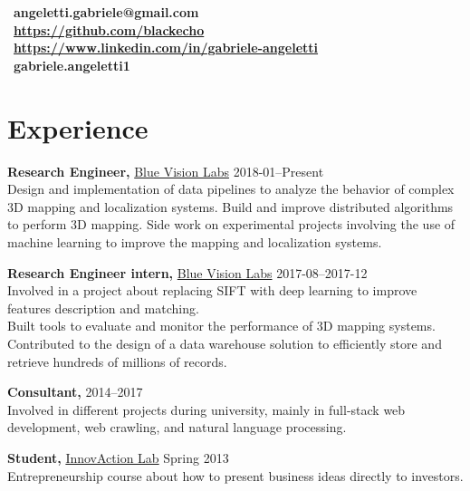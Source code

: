 \documentclass[margin]{res}
\begin{document}
    \address{London, UK  \\ (+44) 7803 056685}
    \begin{resume}
        \section{}
        \faEnvelope~\textbf{angeletti.gabriele@gmail.com} \\[5pt]
        \faGithub~\textbf{\url{https://github.com/blackecho}} \\[5pt]
        \faLinkedin~\textbf{\url{https://www.linkedin.com/in/gabriele-angeletti}} \\[5pt]
        \faSkype~\textbf{gabriele.angeletti1}

        \section{Experience}
            {\bf Research Engineer,} \href{http://www.bluevisionlabs.com}{Blue Vision Labs} \hfill 2018-01--Present\\
            Design and implementation of data pipelines to analyze the behavior of complex 3D mapping and localization systems.
            Build and improve distributed algorithms to perform 3D mapping.
            Side work on experimental projects involving the use of machine learning to improve the mapping and localization systems.

            {\bf Research Engineer intern,} \href{http://www.bluevisionlabs.com}{Blue Vision Labs} \hfill 2017-08--2017-12\\
            Involved in a project about replacing SIFT with deep learning to improve features description and matching.\\
	        Built tools to evaluate and monitor the performance of 3D mapping systems.\\
	        Contributed to the design of a data warehouse solution to efficiently store and retrieve hundreds of millions of records.

            {\bf Consultant,} \hfill 2014--2017\\
            Involved in different projects during university, mainly in full-stack web development,
            web crawling, and natural language processing.

            {\bf Student,} \href{http://www.innovactionlab.org/?lang=en}{InnovAction Lab} \hfill Spring 2013\\
            Entrepreneurship course about how to present business ideas directly to investors.


\end{resume}
\end{document}
